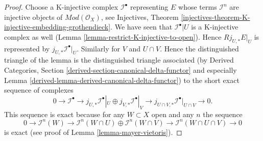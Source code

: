 \documentclass[10pt,a4paper]{amsart}
\theoremstyle{plain}
\theoremstyle{definition}
\theoremstyle{remark}
\numberwithin{equation}{subsection}
\begin{document}
\begin{proof}
Choose a K-injective complex $\mathcal{I}^\bullet$ representing $E$
whose terms $\mathcal{I}^n$ are injective objects of
$\textit{Mod}(\mathcal{O}_X)$, see Injectives, Theorem
\ref{injectives-theorem-K-injective-embedding-grothendieck}.
We have seen that $\mathcal{I}^\bullet|U$ is a K-injective complex
as well (Lemma \ref{lemma-restrict-K-injective-to-open}). Hence
$Rj_{U, *}E|_U$ is represented by $j_{U, *}\mathcal{I}^\bullet|_U$.
Similarly for $V$ and $U \cap V$. Hence the distinguished triangle
of the lemma is the distinguished triangle associated (by
Derived Categories, Section
\ref{derived-section-canonical-delta-functor} and especially
Lemma \ref{derived-lemma-derived-canonical-delta-functor})
to the short exact sequence of complexes
$$
0 \to
\mathcal{I}^\bullet \to
j_{U, *}\mathcal{I}^\bullet|_U \oplus j_{V, *}\mathcal{I}^\bullet|_V \to
j_{U \cap V, *}\mathcal{I}^\bullet|_{U \cap V} \to
0.
$$
This sequence is exact because for any $W \subset X$ open
and any $n$ the sequence
$$
0 \to
\mathcal{I}^n(W) \to
\mathcal{I}^n(W \cap U) \oplus \mathcal{I}^n(W \cap V) \to
\mathcal{I}^n(W \cap U \cap V) \to
0
$$
is exact (see proof of Lemma \ref{lemma-mayer-vietoris}).
\end{proof}
\end{document}

